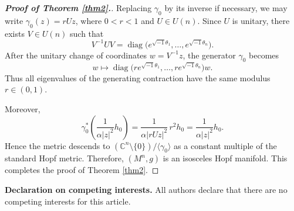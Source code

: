 \documentclass{amsart}
\numberwithin{equation}{section}
\begin{document}
\begin{proof}[{\bf Proof of Theorem \ref{thm2}.}]
Replacing $\gamma_0$ by its inverse if necessary, we may write $\gamma_0(z)=rUz$, where $0<r<1$ and $U\in U(n)$. Since $U$ is unitary, there exists $V\in U(n)$ such that $$
V^{-1}UV
=
\operatorname{diag}
\bigl(e^{\sqrt{-1}\theta_1},\ldots,e^{\sqrt{-1}\theta_n}\bigr).
$$
After the unitary change of coordinates $w=V^{-1}z$, the generator $\gamma_0$ becomes
$$
w\longmapsto
\operatorname{diag}
\bigl(
re^{\sqrt{-1}\theta_1},\ldots,re^{\sqrt{-1}\theta_n}
\bigr)w.
$$
Thus all eigenvalues of the generating contraction have the same modulus $r\in(0,1)$.

Moreover,
$$
\gamma_0^*
\left(\frac{1}{\alpha|z|^2}h_0\right)
=
\frac{1}{\alpha|rUz|^2}\,r^2h_0
=
\frac{1}{\alpha|z|^2}h_0.
$$
Hence the metric descends to $(\mathbb C^n\setminus \{0\})/\langle\gamma_0\rangle$ as a constant multiple of the standard Hopf metric. Therefore, $(M^n,g)$ is an isosceles Hopf manifold. This completes the proof of Theorem \ref{thm2}.
\end{proof}



\vspace{0.3cm}

\noindent\textbf{Declaration on competing interests.}
All authors declare that there are no competing interests for this article.

\vspace{0.3cm}
\end{document}
